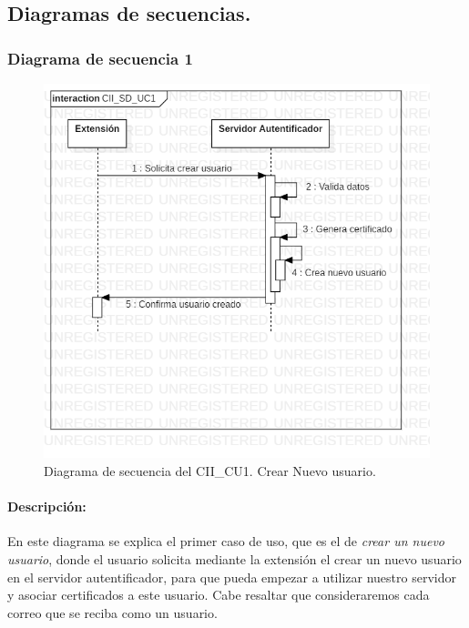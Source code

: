 \documentclass[12pt, a4paper, titlepage]{report}
\begin{document}
		    \subsection{Diagramas de secuencias.}
		
		        \subsubsection{Diagrama de secuencia 1}
            	\begin{figure}[H]
    			    \begin{center} \includegraphics[width=12cm]{./imagenes/Disenio/Componente_2/CII_SD_UC1.png}
    			    \caption[Diagrama de secuencia 1 del Componente II]{Diagrama de secuencia del CII\_CU1. Crear Nuevo usuario.}
    		        \end{center}
    		    \end{figure}
    		    
    		    \paragraph{Descripción:} En este diagrama se explica el primer caso de uso, que es el de \textit{crear un nuevo usuario}, donde el usuario solicita mediante la extensión el crear un nuevo usuario en el servidor autentificador, para que pueda empezar a utilizar nuestro servidor y asociar certificados a este usuario. Cabe resaltar que consideraremos cada correo que se reciba como un usuario.
    		    
\end{document}
